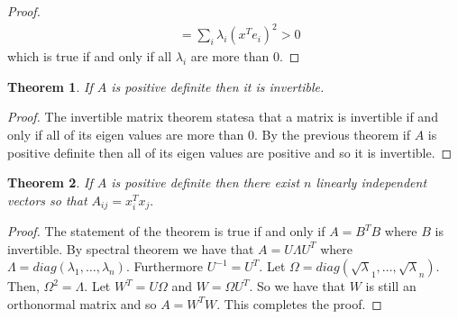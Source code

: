 \documentclass[letter]{article}
\newtheorem{theorem}{Theorem}
\newenvironment{menumerate}{%
  \edef\backupindent{\the\parindent}%
  \enumerate%
  \setlength{\parindent}{\backupindent}%
}{\endenumerate}
\begin{document}
\begin{menumerate}
\begin{menumerate}
\begin{proof}
\begin{equation}
\begin{aligned}
              &= \sum_i \lambda_i (x^Te_i)^2 > 0
         \end{aligned}   
      \end{equation}   
      which is true if and only if all $\lambda_i$ are more than 0.
    \end{proof}
    \item 
    \begin{theorem}
      If $A$ is positive definite then it is invertible.   
    \end{theorem}
    \begin{proof}
      The invertible matrix theorem statesa that a matrix is invertible if and only if all of its eigen values
      are more than $0$. By the previous theorem if $A$ is positive definite then all of its eigen values
       are positive and so it is invertible.   
    \end{proof}
    \item
    \begin{theorem}
      If $A$ is positive definite then there exist $n$ linearly independent vectors so that 
      $A_{ij} = x^T_ix_j.$   
    \end{theorem}
    \begin{proof}
      The statement of the theorem is true if and only if $A = B^TB$ where $B$ is invertible. 
      By spectral theorem we have that $A = U\Lambda U^T$ where $\Lambda = diag(\lambda_1, \dots, \lambda_n).$
      Furthermore $U^{-1} = U^T$. Let $\Omega = diag(\sqrt \lambda_1, \dots, \sqrt \lambda_n).$ Then, 
      $\Omega^2 = \Lambda.$ Let $W^T = U\Omega$ and $W = \Omega U^T.$ So we have that $W$ is still an orthonormal matrix
      and so $A = W^TW.$ This completes the proof.
    \end{proof}
  \end{menumerate}



\end{menumerate}
\end{document}
